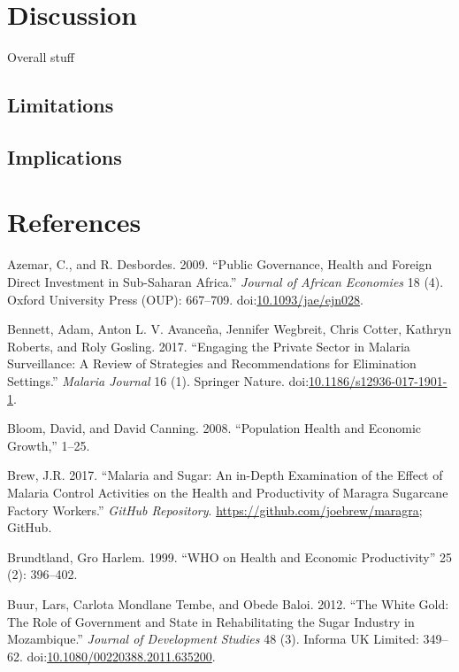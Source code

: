 \documentclass[]{article}
\begin{document}
\section{Discussion}\label{discussion}

Overall stuff

\subsection{Limitations}\label{limitations}

\subsection{Implications}\label{implications}

\section*{References}\label{references}

\hypertarget{refs}{}
\hypertarget{ref-Azemar2009}{}
Azemar, C., and R. Desbordes. 2009. ``Public Governance, Health and
Foreign Direct Investment in Sub-Saharan Africa.'' \emph{Journal of
African Economies} 18 (4). Oxford University Press (OUP): 667--709.
doi:\href{https://doi.org/10.1093/jae/ejn028}{10.1093/jae/ejn028}.

\hypertarget{ref-Bennett_2017}{}
Bennett, Adam, Anton L. V. Avanceña, Jennifer Wegbreit, Chris Cotter,
Kathryn Roberts, and Roly Gosling. 2017. ``Engaging the Private Sector
in Malaria Surveillance: A Review of Strategies and Recommendations for
Elimination Settings.'' \emph{Malaria Journal} 16 (1). Springer Nature.
doi:\href{https://doi.org/10.1186/s12936-017-1901-1}{10.1186/s12936-017-1901-1}.

\hypertarget{ref-Bloom2008}{}
Bloom, David, and David Canning. 2008. ``Population Health and Economic
Growth,'' 1--25.

\hypertarget{ref-brewgit}{}
Brew, J.R. 2017. ``Malaria and Sugar: An in-Depth Examination of the
Effect of Malaria Control Activities on the Health and Productivity of
Maragra Sugarcane Factory Workers.'' \emph{GitHub Repository}.
\url{https://github.com/joebrew/maragra}; GitHub.

\hypertarget{ref-World1999}{}
Brundtland, Gro Harlem. 1999. ``WHO on Health and Economic
Productivity'' 25 (2): 396--402.

\hypertarget{ref-Buur2012}{}
Buur, Lars, Carlota Mondlane Tembe, and Obede Baloi. 2012. ``The White
Gold: The Role of Government and State in Rehabilitating the Sugar
Industry in Mozambique.'' \emph{Journal of Development Studies} 48 (3).
Informa UK Limited: 349--62.
doi:\href{https://doi.org/10.1080/00220388.2011.635200}{10.1080/00220388.2011.635200}.
\end{document}
